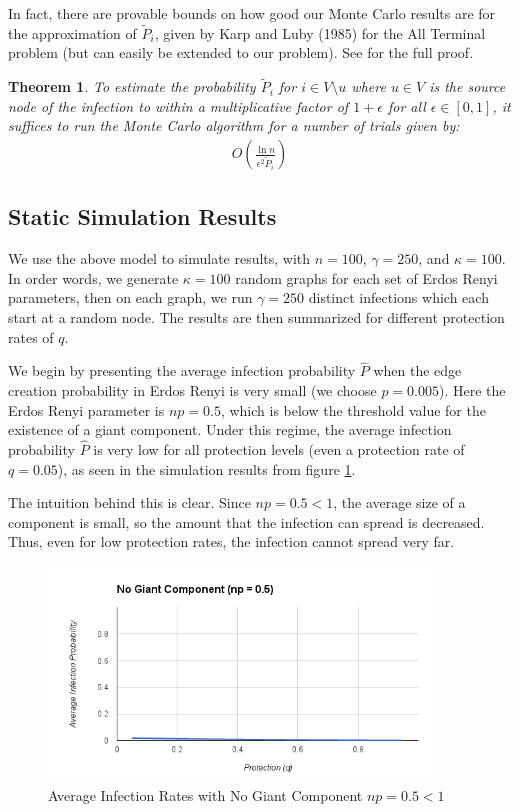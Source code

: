 \documentclass{article}
\theoremstyle{plain}
\newtheorem{theorem}{Theorem}
\begin{document}
In fact, there are provable bounds on how good our Monte Carlo results are for the approximation of $\tilde{P}_i$, given by Karp and Luby (1985) for the All Terminal problem (but can easily be extended to our problem). See \cite{karp-luby85} for the full proof.

\begin{theorem}
  To estimate the probability $\tilde{P}_i$ for $i \in V \setminus u$ where $u \in V$ is the source node of the infection to within a multiplicative factor of $1 + \epsilon$ for all $\epsilon \in [0,1]$, it suffices to run the Monte Carlo algorithm for a number of trials given by:
  \begin{eqnarray}
    O \left( \frac{\ln n}{\epsilon^2 \tilde{P}_i} \right)
  \end{eqnarray}
\end{theorem}

\subsection{Static Simulation Results}

We use the above model to simulate results, with $n = 100$, $\gamma = 250$, and $\kappa = 100$. In order words, we generate $\kappa = 100$ random graphs for each set of Erdos Renyi parameters, then on each graph, we run $\gamma = 250$ distinct infections which each start at a random node. The results are then summarized for different protection rates of $q$.

We begin by presenting the average infection probability $\hat{P}$ when the edge creation probability in Erdos Renyi is very small (we choose $p = 0.005$). Here the Erdos Renyi parameter is $np = 0.5$, which is below the threshold value for the existence of a giant component. Under this regime, the average infection probability $\hat{P}$ is very low for all protection levels (even a protection rate of $q = 0.05$), as seen in the simulation results from figure \ref{avg_prob_np05.fig}.

The intuition behind this is clear. Since $np = 0.5 < 1$, the average size of a component is small, so the amount that the infection can spread is decreased. Thus, even for low protection rates, the infection cannot spread very far.

\begin{figure}[h!]
  \centering
  \includegraphics[width=4in]{avg_prob_np05.png}
  \caption{Average Infection Rates with No Giant Component $np = 0.5 < 1$}
  \label{avg_prob_np05.fig}
\end{figure}
\end{document}
